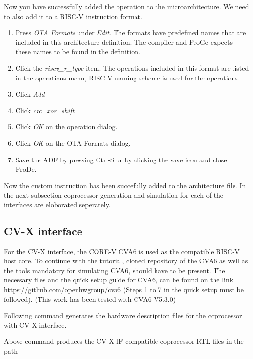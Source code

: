 \documentclass[a4paper,twoside]{tceusermanual}
\begin{document}
Now you have successfully added the operation to the microarchitecture. We need to also add it to a 
RISC-V instruction format.

\begin{enumerate}
  \item%
    Press \emph{OTA Formats} under \emph{Edit}.
    The formats have predefined names that are included in this
    architecture definition. The compiler and ProGe expects these names to be 
    found in the definition. 
  \item%
    Click the \emph{riscv\_r\_type} item.
    The operations included in this format are listed in the operations menu,
    RISC-V naming scheme is used for the operations.
  \item%
    Click \emph{Add}
  \item%
    Click \emph{crc\_xor\_shift}
  \item%
    Click \emph{OK} on the operation dialog.
  \item%
    Click \emph{OK} on the OTA Formats dialog.
  \item%
    Save the ADF by pressing Ctrl-S or by clicking the save icon and close ProDe.
\end{enumerate}

Now the custom instruction has been succefully added to the architecture file. In the next 
subsection coprocessor generation and simulation for each of the interfaces are eloborated seperately.

\subsection{CV-X interface}
\label{ssec:cvxinterface}

For the CV-X interface, the CORE-V CVA6 is used as the compatible RISC-V host core. To continue with 
the tutorial, cloned repository of the CVA6 as well as the tools mandatory for simulating CVA6, 
should have to be present. The necessary files and the quick setup guide for CVA6, can be found on the link:
\url{https://github.com/openhwgroup/cva6} 
(Steps 1 to 7 in the quick setup must be followed). (This work has been tested with CVA6 V5.3.0)

Following command generates the hardware description files for the coprocessor with CV-X interface.


Above command produces the CV-X-IF compatible coprocessor RTL files in the path 
\end{document}
